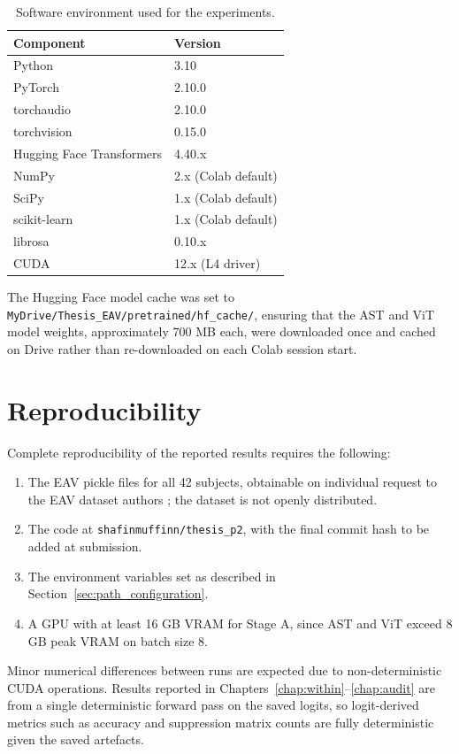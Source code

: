 \begin{table}[htbp]
\centering
\small
\caption{Software environment used for the experiments.}
\label{tab:software_environment}
\begin{tabular}{p{5cm} p{6cm}}
\hline
\textbf{Component} & \textbf{Version} \\
\hline
Python & 3.10 \\
PyTorch & 2.10.0 \\
torchaudio & 2.10.0 \\
torchvision & 0.15.0 \\
Hugging Face Transformers & 4.40.x \\
NumPy & 2.x (Colab default) \\
SciPy & 1.x (Colab default) \\
scikit-learn & 1.x (Colab default) \\
librosa & 0.10.x \\
CUDA & 12.x (L4 driver) \\
\hline
\end{tabular}
\end{table}

The Hugging Face model cache was set to \texttt{MyDrive/Thesis\_EAV/pretrained/hf\_cache/}, ensuring that the AST and ViT model weights, approximately 700 MB each, were downloaded once and cached on Drive rather than re-downloaded on each Colab session start.

\section{Reproducibility}
Complete reproducibility of the reported results requires the following:

\begin{enumerate}
    \item The EAV pickle files for all 42 subjects, obtainable on individual request to the EAV dataset authors \cite{Lee2024EAV}; the dataset is not openly distributed.
    \item The code at \texttt{shafinmuffinn/thesis\_p2}, with the final commit hash to be added at submission.
    \item The environment variables set as described in Section~\ref{sec:path_configuration}.
    \item A GPU with at least 16 GB VRAM for Stage A, since AST and ViT exceed 8 GB peak VRAM on batch size 8.
\end{enumerate}

Minor numerical differences between runs are expected due to non-deterministic CUDA operations. Results reported in Chapters~\ref{chap:within}--\ref{chap:audit} are from a single deterministic forward pass on the saved logits, so logit-derived metrics such as accuracy and suppression matrix counts are fully deterministic given the saved artefacts.